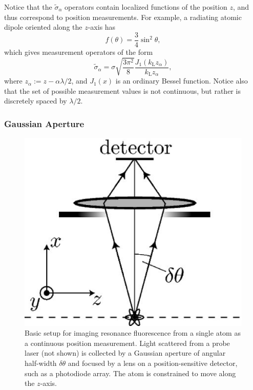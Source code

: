 \documentclass[12pt,aps,onecolum,superscriptaddress,footinbib,floatfix,showpacs]{revtex4-1}
\def\kL{k_\mathrm{\scriptscriptstyle L}}
\begin{document}
Notice that the $\tilde\sigma_\alpha$ operators
contain localized functions of the position $z$, and thus correspond
to position measurements.
For example, a radiating atomic dipole oriented along the $z$-axis
has
\begin{equation}
  f(\theta) = \frac{3}{4}\sin^2\theta,
  \label{ftheta}
\end{equation}
which gives measurement operators of the form
\begin{equation}
  \tilde \sigma_{\alpha} = \sigma
    \sqrt{\frac{3\pi^2}{8}}
      \frac{J_1(\kL z_\alpha)}{\kL z_\alpha},
\end{equation}
where $z_\alpha := z-\alpha\lambda/2$, and $J_1(x)$ is an ordinary
Bessel function.
Notice also that the set of possible measurement values is not 
continuous, but rather is discretely spaced by $\lambda/2$.


\subsubsection{Gaussian Aperture}

\begin{figure}[tb]
  \begin{center}
    \includegraphics[width=0.5\hsize]{imagingsetup.bmap.300.eps}
  \end{center}
  \vspace{-5mm}
  \caption
        {Basic setup for imaging resonance fluorescence from
         a single atom as a continuous position measurement.
         Light scattered from a probe laser (not shown)
         is collected by a Gaussian aperture of angular half-width
         $\delta \theta$ and focused by a lens on a position-sensitive
         detector, such as a photodiode array.  The atom is
         constrained to move along the $z$-axis.
	\label{fig:imaging}}
\end{figure}
\end{document}
